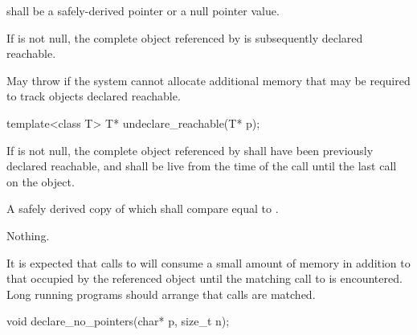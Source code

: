 \begin{itemdescr}
\pnum
\requires {} shall be a safely-derived
pointer or a null pointer value.

\pnum
\effects If  is not null, the complete object referenced by 
is subsequently declared reachable.

\pnum
\throws May throw  if the system cannot allocate
additional memory that may be required to track objects declared reachable.
\end{itemdescr}

%
\begin{itemdecl}
template<class T> T* undeclare_reachable(T* p);
\end{itemdecl}

\begin{itemdescr}
\pnum
\requires If  is not null, the complete object referenced by 
shall have been previously declared reachable, and shall be
live from the time of the call until the last
 call on the object.

\pnum
\returns A safely derived copy of  which shall compare equal to .

\pnum
\throws Nothing.

\pnum \begin{note} It is expected that calls to  will consume
a small amount of memory in addition to that occupied by the referenced object until the
matching call to  is encountered. Long running programs
should arrange that calls are matched. \end{note} \end{itemdescr}

%
\begin{itemdecl}
void declare_no_pointers(char* p, size_t n);
\end{itemdecl}

